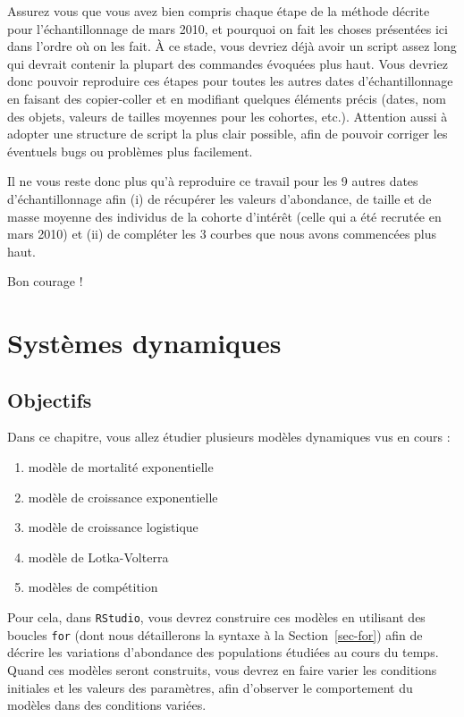 \documentclass[
  french,
  a4paper,
  DIV=11,
  numbers=noendperiod,
  oneside]{scrreprt}
\providecommand{\tightlist}{%
  \setlength{\itemsep}{0pt}\setlength{\parskip}{0pt}}
\begin{document}
\begin{tcolorbox}
\begin{figure}
\end{figure}%

Assurez vous que vous avez bien compris chaque étape de la méthode
décrite pour l'échantillonnage de mars 2010, et pourquoi on fait les
choses présentées ici dans l'ordre où on les fait. À ce stade, vous
devriez déjà avoir un script assez long qui devrait contenir la plupart
des commandes évoquées plus haut. Vous devriez donc pouvoir reproduire
ces étapes pour toutes les autres dates d'échantillonnage en faisant des
copier-coller et en modifiant quelques éléments précis (dates, nom des
objets, valeurs de tailles moyennes pour les cohortes, etc.). Attention
aussi à adopter une structure de script la plus clair possible, afin de
pouvoir corriger les éventuels bugs ou problèmes plus facilement.

Il ne vous reste donc plus qu'à reproduire ce travail pour les 9 autres
dates d'échantillonnage afin (i) de récupérer les valeurs d'abondance,
de taille et de masse moyenne des individus de la cohorte d'intérêt
(celle qui a été recrutée en mars 2010) et (ii) de compléter les 3
courbes que nous avons commencées plus haut.

Bon courage !


\chapter{Systèmes dynamiques}\label{sec-dynam}

\section{Objectifs}\label{objectifs-3}

Dans ce chapitre, vous allez étudier plusieurs modèles dynamiques vus en
cours :

\begin{enumerate}
\def\labelenumi{\arabic{enumi}.}
\tightlist
\item
  modèle de mortalité exponentielle
\item
  modèle de croissance exponentielle
\item
  modèle de croissance logistique
\item
  modèle de Lotka-Volterra
\item
  modèles de compétition
\end{enumerate}

Pour cela, dans \texttt{RStudio}, vous devrez construire ces modèles en
utilisant des boucles \texttt{for} (dont nous détaillerons la syntaxe à
la Section~\ref{sec-for}) afin de décrire les variations d'abondance des
populations étudiées au cours du temps. Quand ces modèles seront
construits, vous devrez en faire varier les conditions initiales et les
valeurs des paramètres, afin d'observer le comportement du modèles dans
des conditions variées.


\end{tcolorbox}
\end{document}
